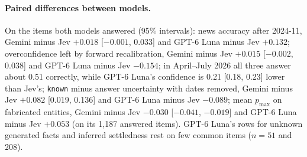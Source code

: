 \documentclass[10pt,twocolumn]{article}
\newcommand{\pmax}{p_{\max}}
\begin{document}
\paragraph{Paired differences between models.} On the items both models
answered (95\% intervals): news accuracy after 2024-11, Gemini minus Jev
$+0.018$ [$-0.001$, 0.033] and GPT-6 Luna minus Jev $+0.132$; overconfidence
left by forward recalibration, Gemini minus Jev $+0.015$ [$-0.002$, 0.038]
and GPT-6 Luna minus Jev $-0.154$; in April--July 2026 all three answer
about 0.51 correctly, while GPT-6 Luna's confidence is 0.21 [0.18, 0.23]
lower than Jev's; \texttt{known} minus answer uncertainty with dates removed,
Gemini minus Jev $+0.082$ [0.019, 0.136] and GPT-6 Luna minus Jev $-0.089$;
mean $\pmax$ on fabricated entities, Gemini minus Jev $-0.030$ [$-0.041$,
$-0.019$] and GPT-6 Luna minus Jev $+0.053$ (on its 1{,}187 answered items).
GPT-6 Luna's rows for unknown generated facts and inferred settledness rest
on few common items ($n=51$ and 208).
\end{document}
